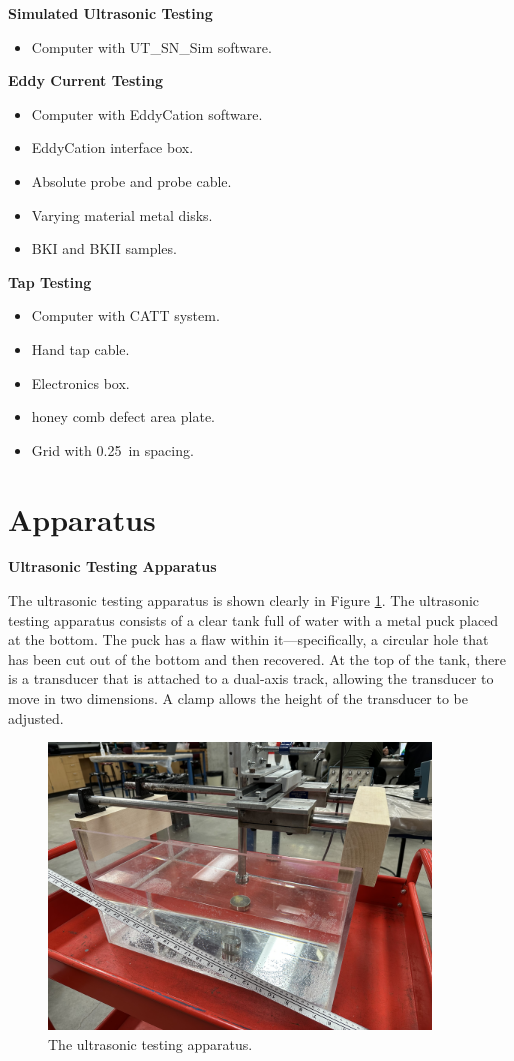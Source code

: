 \documentclass[12 pt]{report}
\begin{document}
\textbf{Simulated Ultrasonic Testing}
\begin{itemize}
	\item Computer with UT\_SN\_Sim software.
\end{itemize}

\textbf{Eddy Current Testing}
\begin{itemize}
	\item Computer with EddyCation software.
	\item EddyCation interface box.
	\item Absolute probe and probe cable.
	\item Varying material metal disks.
	\item BKI and BKII samples.
\end{itemize}

\textbf{Tap Testing}
\begin{itemize}
	\item Computer with CATT system.
	\item Hand tap cable.
	\item Electronics box.
	\item {} honey comb defect area plate.
	\item Grid with \qty{0.25}{in} spacing.
\end{itemize}

\section{Apparatus} \label{apparatus}
\textbf{Ultrasonic Testing Apparatus}

The ultrasonic testing apparatus is shown clearly in Figure \ref{fig:ultrasonic_apparatus}. The ultrasonic testing apparatus consists of a clear tank full of water with a metal puck placed at the bottom. The puck has a flaw within it---specifically, a circular hole that has been cut out of the bottom and then recovered. At the top of the tank, there is a transducer that is attached to a dual-axis track, allowing the transducer to move in two dimensions. A clamp allows the height of the transducer to be adjusted.

\begin{figure}[htbp]
	\centering
	\includegraphics[width=4in]{images/ultrasonic_apparatus}
	\caption{The ultrasonic testing apparatus.}
	\label{fig:ultrasonic_apparatus}
\end{figure}
\end{document}
